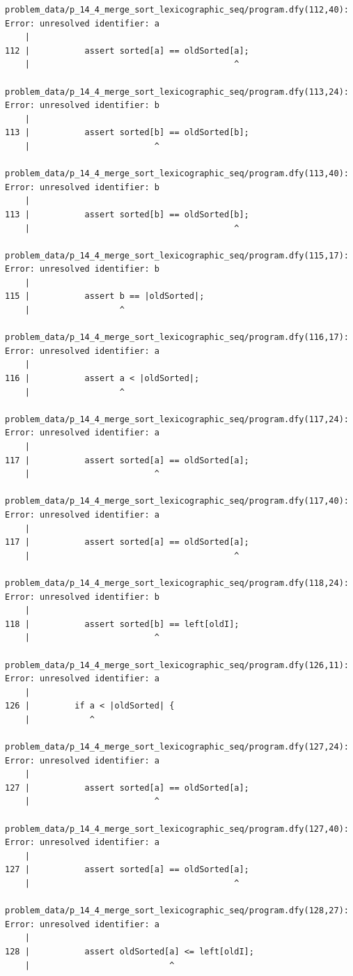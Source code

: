 \documentclass{article}
\begin{document}
\begin{lstlisting}
problem_data/p_14_4_merge_sort_lexicographic_seq/program.dfy(112,40): Error: unresolved identifier: a
    |
112 |           assert sorted[a] == oldSorted[a];
    |                                         ^

problem_data/p_14_4_merge_sort_lexicographic_seq/program.dfy(113,24): Error: unresolved identifier: b
    |
113 |           assert sorted[b] == oldSorted[b];
    |                         ^

problem_data/p_14_4_merge_sort_lexicographic_seq/program.dfy(113,40): Error: unresolved identifier: b
    |
113 |           assert sorted[b] == oldSorted[b];
    |                                         ^

problem_data/p_14_4_merge_sort_lexicographic_seq/program.dfy(115,17): Error: unresolved identifier: b
    |
115 |           assert b == |oldSorted|;
    |                  ^

problem_data/p_14_4_merge_sort_lexicographic_seq/program.dfy(116,17): Error: unresolved identifier: a
    |
116 |           assert a < |oldSorted|;
    |                  ^

problem_data/p_14_4_merge_sort_lexicographic_seq/program.dfy(117,24): Error: unresolved identifier: a
    |
117 |           assert sorted[a] == oldSorted[a];
    |                         ^

problem_data/p_14_4_merge_sort_lexicographic_seq/program.dfy(117,40): Error: unresolved identifier: a
    |
117 |           assert sorted[a] == oldSorted[a];
    |                                         ^

problem_data/p_14_4_merge_sort_lexicographic_seq/program.dfy(118,24): Error: unresolved identifier: b
    |
118 |           assert sorted[b] == left[oldI];
    |                         ^

problem_data/p_14_4_merge_sort_lexicographic_seq/program.dfy(126,11): Error: unresolved identifier: a
    |
126 |         if a < |oldSorted| {
    |            ^

problem_data/p_14_4_merge_sort_lexicographic_seq/program.dfy(127,24): Error: unresolved identifier: a
    |
127 |           assert sorted[a] == oldSorted[a];
    |                         ^

problem_data/p_14_4_merge_sort_lexicographic_seq/program.dfy(127,40): Error: unresolved identifier: a
    |
127 |           assert sorted[a] == oldSorted[a];
    |                                         ^

problem_data/p_14_4_merge_sort_lexicographic_seq/program.dfy(128,27): Error: unresolved identifier: a
    |
128 |           assert oldSorted[a] <= left[oldI];
    |                            ^


\end{lstlisting}
\end{document}
